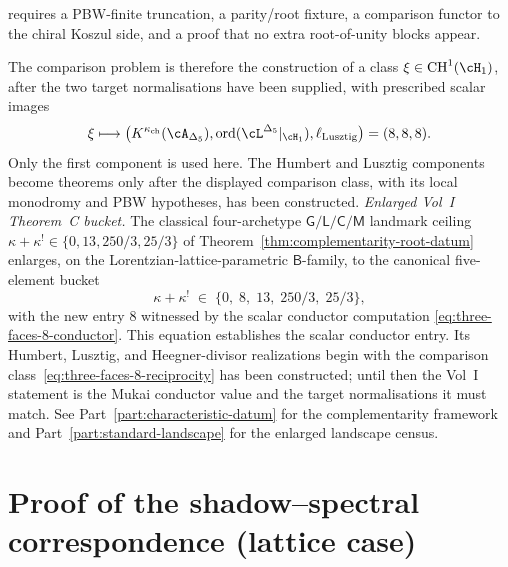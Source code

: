 \begin{remark}
\begin{enumerate}[label=\textup{(\roman*)}]
requires a PBW-finite truncation, a parity/root fixture, a comparison
functor to the chiral Koszul side, and a proof that no extra
root-of-unity blocks appear.
\end{enumerate}
The comparison problem is therefore the construction of a class
$\xi \in \mathrm{CH}^1(\cH_1)$, after the two target normalisations have
been supplied, with prescribed scalar images
\begin{equation}\label{eq:three-faces-8-reciprocity}
 \xi
 \longmapsto
 \bigl(
 K^{\kappa_{\mathrm{ch}}}(\cA_{\Delta_5}),
 \operatorname{ord}(\cL^{\Delta_5}|_{\cH_1}),
 \ell_{\mathrm{Lusztig}}
 \bigr)
 =
 (8,8,8).
\end{equation}
Only the first component is used here. The Humbert and Lusztig
components become theorems only after the displayed comparison class,
with its local monodromy and PBW hypotheses, has been constructed.
\emph{Enlarged Vol~I Theorem~C bucket.} The classical four-archetype
$\mathsf{G}/\mathsf{L}/\mathsf{C}/\mathsf{M}$ landmark ceiling
$\kappa + \kappa^! \in \{0, 13, 250/3, 25/3\}$ of
Theorem~\ref{thm:complementarity-root-datum} enlarges, on the
Lorentzian-lattice-parametric $\mathsf{B}$-family, to the canonical
five-element bucket
\begin{equation}\label{eq:theorem-c-bucket-enlarged-arithmetic}
 \kappa + \kappa^!
 \;\in\;
 \{0,\; 8,\; 13,\; 250/3,\; 25/3\},
\end{equation}
with the new entry $8$ witnessed by the scalar conductor computation
\eqref{eq:three-faces-8-conductor}.  This equation establishes the
scalar conductor entry.  Its Humbert, Lusztig, and Heegner-divisor
realizations begin with the comparison class~\eqref{eq:three-faces-8-reciprocity}
has been constructed; until then the Vol~I statement is the Mukai
conductor value and the target normalisations it must match.
See Part~\ref{part:characteristic-datum} for the complementarity
framework and Part~\ref{part:standard-landscape} for the enlarged
landscape census.
\end{remark}

\section{Proof of the shadow--spectral correspondence
(lattice case)}\label{sec:proof-lattice-case}

